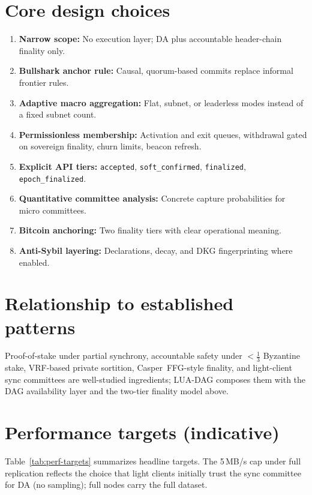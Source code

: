 \documentclass[11pt,a4paper,twoside]{report}
\theoremstyle{definition}
\begin{document}
\section{Core design choices}
\begin{enumerate}[leftmargin=*]
  \item \textbf{Narrow scope:} No execution layer; DA plus accountable header-chain finality only.
  \item \textbf{Bullshark anchor rule:} Causal, quorum-based commits replace informal frontier rules.
  \item \textbf{Adaptive macro aggregation:} Flat, subnet, or leaderless modes instead of a fixed subnet count.
  \item \textbf{Permissionless membership:} Activation and exit queues, withdrawal gated on sovereign finality, churn limits, beacon refresh.
  \item \textbf{Explicit API tiers:} \texttt{accepted}, \texttt{soft\_confirmed}, \texttt{finalized}, \texttt{epoch\_finalized}.
  \item \textbf{Quantitative committee analysis:} Concrete capture probabilities for micro committees.
  \item \textbf{Bitcoin anchoring:} Two finality tiers with clear operational meaning.
  \item \textbf{Anti-Sybil layering:} Declarations, decay, and DKG fingerprinting where enabled.
\end{enumerate}

\section{Relationship to established patterns}
Proof-of-stake under partial synchrony, accountable safety under $< \frac{1}{3}$ Byzantine stake, VRF-based private sortition, Casper~FFG-style finality, and light-client sync committees are well-studied ingredients; LUA-DAG composes them with the DAG availability layer and the two-tier finality model above.

\section{Performance targets (indicative)}
Table~\ref{tab:perf-targets} summarizes headline targets. The 5\,MB/s cap under full replication reflects the choice that light clients initially trust the sync committee for DA (no sampling); full nodes carry the full dataset.
\end{document}
